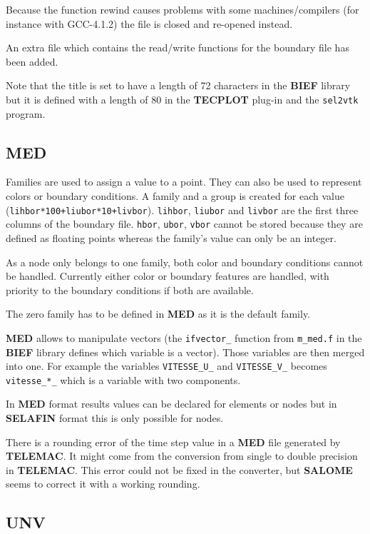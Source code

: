 \documentclass[a4paper,10pt]{article}
\newcommand{\tel}{\textbf{TELEMAC}\xspace}
\newcommand{\bief}{\textbf{BIEF}\xspace}
\newcommand{\slf}{\textbf{SELAFIN}\xspace}
\newcommand{\sal}{\textbf{SALOME}\xspace}
\newcommand{\unv}{\textbf{UNV}\xspace}
\newcommand{\med}{\textbf{MED}\xspace}
\newcommand{\tecplot}{\textbf{TECPLOT}\xspace}
\begin{document}
Because the function rewind causes problems with some machines/compilers (for
instance with GCC-4.1.2) the file is closed and re-opened instead.

An extra file which contains the read/write functions for the boundary file has
been added.

Note that the title is set to have a length of 72 characters in the \bief
library but it is defined with a length of 80 in the \tecplot plug-in and the
\verb+sel2vtk+ program.

\subsection{\med}

Families are used to assign a value to a point. They can also be used to
represent colors or boundary conditions.  A family and a group is created for
each value (\verb?lihbor*100+liubor*10+livbor?). \verb+lihbor+, \verb+liubor+
and \verb+livbor+ are the first three columns of the boundary file.
\verb+hbor+, \verb+ubor+, \verb+vbor+ cannot be stored because they are defined
as floating points whereas the family's value can only be an integer.

As a node only belongs to one family, both color and boundary conditions cannot
be handled.  Currently either color or boundary features are handled, with
priority to the boundary conditions if both are available.

The zero family has to be defined in \med as it is the default family.

\med allows to manipulate vectors (the \verb+ifvector_+ function from
\verb+m_med.f+ in the \bief library defines which variable is a vector). Those
variables are then merged into one. For example the variables \verb+VITESSE_U_+
and \verb+VITESSE_V_+ becomes \verb+vitesse_*_+ which is a variable with two
components.

In \med format results values can be declared for elements or nodes but in \slf
format this is only possible for nodes.

There is a rounding error of the time step value in a \med file generated by
\tel. It might come from the conversion from single to double precision in
\tel. This error could not be fixed in the converter, but \sal seems to correct
it with a working rounding.

\subsection{\unv}
\end{document}
